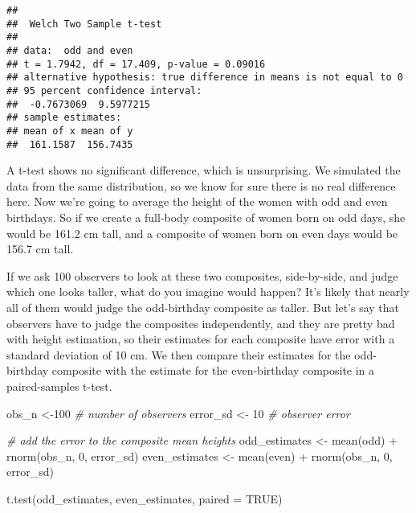 \documentclass[
  doc,floatsintext]{apa6}
\newenvironment{Shaded}{\begin{snugshade}}{\end{snugshade}}
\newcommand{\AttributeTok}[1]{\textcolor[rgb]{0.77,0.63,0.00}{#1}}
\newcommand{\CommentTok}[1]{\textcolor[rgb]{0.56,0.35,0.01}{\textit{#1}}}
\newcommand{\ConstantTok}[1]{\textcolor[rgb]{0.00,0.00,0.00}{#1}}
\newcommand{\DecValTok}[1]{\textcolor[rgb]{0.00,0.00,0.81}{#1}}
\newcommand{\FunctionTok}[1]{\textcolor[rgb]{0.00,0.00,0.00}{#1}}
\newcommand{\NormalTok}[1]{#1}
\newcommand{\OtherTok}[1]{\textcolor[rgb]{0.56,0.35,0.01}{#1}}
\newcommand{\SpecialCharTok}[1]{\textcolor[rgb]{0.00,0.00,0.00}{#1}}
\begin{document}
\begin{verbatim}
## 
##  Welch Two Sample t-test
## 
## data:  odd and even
## t = 1.7942, df = 17.409, p-value = 0.09016
## alternative hypothesis: true difference in means is not equal to 0
## 95 percent confidence interval:
##  -0.7673069  9.5977215
## sample estimates:
## mean of x mean of y 
##  161.1587  156.7435
\end{verbatim}

A t-test shows no significant difference, which is unsurprising. We simulated the data from the same distribution, so we know for sure there is no real difference here. Now we're going to average the height of the women with odd and even birthdays. So if we create a full-body composite of women born on odd days, she would be 161.2 cm tall, and a composite of women born on even days would be 156.7 cm tall.

If we ask 100 observers to look at these two composites, side-by-side, and judge which one looks taller, what do you imagine would happen? It's likely that nearly all of them would judge the odd-birthday composite as taller. But let's say that observers have to judge the composites independently, and they are pretty bad with height estimation, so their estimates for each composite have error with a standard deviation of 10 cm. We then compare their estimates for the odd-birthday composite with the estimate for the even-birthday composite in a paired-samples t-test.

\begin{Shaded}
\begin{Highlighting}[]
\NormalTok{obs\_n }\OtherTok{\textless{}{-}}\DecValTok{100} \CommentTok{\# number of observers}
\NormalTok{error\_sd }\OtherTok{\textless{}{-}} \DecValTok{10} \CommentTok{\# observer error}

\CommentTok{\# add the error to the composite mean heights}
\NormalTok{odd\_estimates }\OtherTok{\textless{}{-}} \FunctionTok{mean}\NormalTok{(odd) }\SpecialCharTok{+} \FunctionTok{rnorm}\NormalTok{(obs\_n, }\DecValTok{0}\NormalTok{, error\_sd)}
\NormalTok{even\_estimates }\OtherTok{\textless{}{-}} \FunctionTok{mean}\NormalTok{(even) }\SpecialCharTok{+} \FunctionTok{rnorm}\NormalTok{(obs\_n, }\DecValTok{0}\NormalTok{, error\_sd)}

\FunctionTok{t.test}\NormalTok{(odd\_estimates, even\_estimates, }\AttributeTok{paired =} \ConstantTok{TRUE}\NormalTok{)}
\end{Highlighting}
\end{Shaded}
\end{document}
